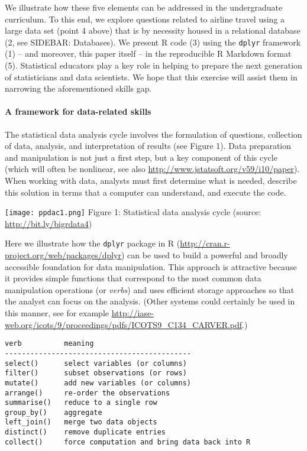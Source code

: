 \documentclass[]{article}
\begin{document}
We illustrate how these five elements can be addressed in the
undergraduate curriculum. To this end, we explore questions related to
airline travel using a large data set (point 4 above) that is by
necessity housed in a relational database (2, see SIDEBAR: Databases).
We present R code (3) using the \texttt{dplyr} framework (1) -- and
moreover, this paper itself -- in the reproducible R Markdown format
(5). Statistical educators play a key role in helping to prepare the
next generation of statisticians and data scientists. We hope that this
exercise will assist them in narrowing the aforementioned skills gap.

\paragraph{A framework for data-related
skills}\label{a-framework-for-data-related-skills}

The statistical data analysis cycle involves the formulation of
questions, collection of data, analysis, and interpretation of results
(see Figure 1). Data preparation and manipulation is not just a first
step, but a key component of this cycle (which will often be nonlinear,
see also \url{http://www.jstatsoft.org/v59/i10/paper}). When working
with data, analysts must first determine what is needed, describe this
solution in terms that a computer can understand, and execute the code.

\texttt{[image: ppdac1.png]} Figure 1: Statistical data analysis cycle
(source: \url{http://bit.ly/bigrdata4})

Here we illustrate how the \texttt{dplyr} package in R
(\url{http://cran.r-project.org/web/packages/dplyr}) can be used to
build a powerful and broadly accessible foundation for data
manipulation. This approach is attractive because it provides simple
functions that correspond to the most common data manipulation
operations (or \emph{verbs}) and uses efficient storage approaches so
that the analyst can focus on the analysis. (Other systems could
certainly be used in this manner, see for example
\url{http://iase-web.org/icots/9/proceedings/pdfs/ICOTS9_C134_CARVER.pdf}.)

\begin{verbatim}
verb          meaning
--------------------------------------------
select()      select variables (or columns)
filter()      subset observations (or rows)
mutate()      add new variables (or columns)
arrange()     re-order the observations
summarise()   reduce to a single row
group_by()    aggregate
left_join()   merge two data objects
distinct()    remove duplicate entries
collect()     force computation and bring data back into R
\end{verbatim}
\end{document}
